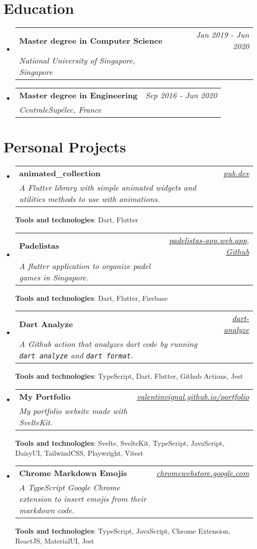 \documentclass[a4paper,11pt]{article}
\newcommand{\cvHeading}[3]{
\vspace{0.5mm}\item
    \begin{tabularx}{0.98\textwidth}[t]{X r}
        \textbf{#1} & \textit{\footnotesize{#2}} \\
        \textit{\footnotesize{#3}} &  {}\\
    \end{tabularx}
    \vspace{-2.4mm}
}
\newcommand{\cvHeadingListStart}{\begin{itemize}[leftmargin=*,labelsep=0mm]}
\newcommand{\cvHeadingListEnd}{\end{itemize}\vspace{2mm}}
\begin{document}
\section{\textbf{Education}}
\cvHeadingListStart
\cvHeading
{Master degree in Computer Science}{Jan 2019 - Jun 2020}
{National University of Singapore, Singapore}
\cvHeading
{Master degree in Engineering}{Sep 2016 - Jun 2020}
{CentraleSupélec, France}
\cvHeadingListEnd


\section{\textbf{Personal Projects}}
\cvHeadingListStart
\cvHeading
{animated\_collection}
{\href{https://pub.dev/packages/animated_collection}{pub.dev}}
{A Flutter library with simple animated widgets and utilities methods to use with animations.}
\hspace{1em}

\hspace{1pt} \small \textbf{Tools and technologies}: {\footnotesize Dart, Flutter}

\cvHeading
{Padelistas}
{\href{https://padelistas-app.web.app/}{padelistas-app.web.app}, \href{https://github.com/ValentinVignal/padelistas}{Github}}
{A flutter application to organize padel games in Singapore.}
\hspace{1em}

\hspace{1pt} \small \textbf{Tools and technologies}: {\footnotesize Dart, Flutter, Firebase}

\cvHeading
{Dart Analyze}
{\href{https://github.com/marketplace/actions/dart-analyze}{dart-analyze}}
{A Github action that analyzes dart code by running \texttt{dart analyze} and \texttt{dart format}.}
\hspace{1em}

\hspace{1pt} \small \textbf{Tools and technologies}: {\footnotesize TypeScript, Dart, Flutter, Github Actions, Jest}

\cvHeading
{My Portfolio}
{\href{https://valentinvignal.github.io/portfolio}{valentinvignal.github.io/portfolio}}
{My portfolio website made with SvelteKit.}
\hspace{1em}

\hspace{1pt} \small \textbf{Tools and technologies}: {\footnotesize Svelte, SvelteKit, TypeScript, JavaScript, DaisyUI, TailwindCSS, Playwright, Vitest}

\cvHeading
{Chrome Markdown Emojis}
{\href{https://chromewebstore.google.com/detail/chrome-markdown-emojis/mojhbkjckfdaikbpfmmlfimchemiabln}{chromewebstore.google.com}}
{A TypeScript Google Chrome extension to insert emojis from their markdown code.}
\hspace{1em}

\hspace{1pt} \small \textbf{Tools and technologies}: {\footnotesize TypeScript, JavaScript, Chrome Extension, ReactJS, MaterialUI, Jest}

\cvHeadingListEnd
\end{document}
